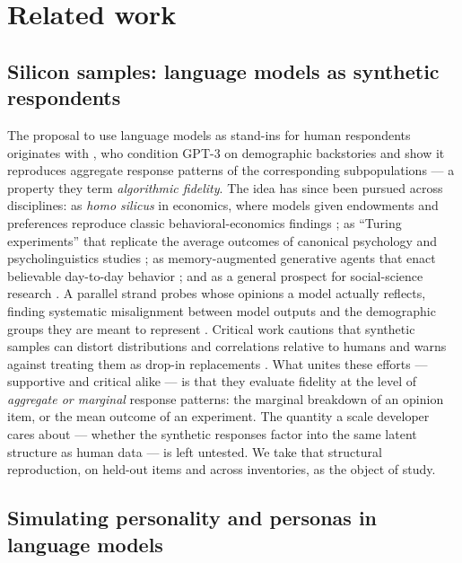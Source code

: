 \documentclass[11pt]{article}
\begin{document}
\section{Related work}

\subsection{Silicon samples: language models as synthetic respondents}

The proposal to use language models as stand-ins for human respondents originates with \citet{argyle2023}, who condition GPT-3 on demographic backstories and show it reproduces aggregate response patterns of the corresponding subpopulations — a property they term \textit{algorithmic fidelity}. The idea has since been pursued across disciplines: as \textit{homo silicus} in economics, where models given endowments and preferences reproduce classic behavioral-economics findings \citep{horton2023}; as ``Turing experiments'' that replicate the average outcomes of canonical psychology and psycholinguistics studies \citep{aher2023}; as memory-augmented generative agents that enact believable day-to-day behavior \citep{park2023}; and as a general prospect for social-science research \citep{grossmann2023}. A parallel strand probes whose opinions a model actually reflects, finding systematic misalignment between model outputs and the demographic groups they are meant to represent \citep{santurkar2023}. Critical work cautions that synthetic samples can distort distributions and correlations relative to humans and warns against treating them as drop-in replacements \citep{bisbee2024,dillion2023}. What unites these efforts — supportive and critical alike — is that they evaluate fidelity at the level of \textit{aggregate or marginal} response patterns: the marginal breakdown of an opinion item, or the mean outcome of an experiment. The quantity a scale developer cares about — whether the synthetic responses factor into the same latent structure as human data — is left untested. We take that structural reproduction, on held-out items and across inventories, as the object of study.

\subsection{Simulating personality and personas in language models}
\end{document}
